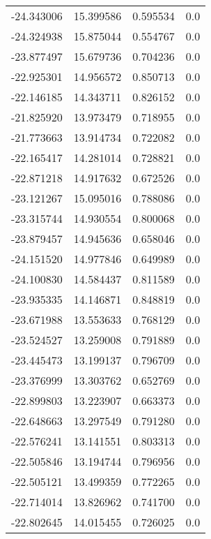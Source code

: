 \begin{tabular}{rrrr}
      -24.343006 &        15.399586 &    0.595534 &   0.0 \\
      -24.324938 &        15.875044 &    0.554767 &   0.0 \\
      -23.877497 &        15.679736 &    0.704236 &   0.0 \\
      -22.925301 &        14.956572 &    0.850713 &   0.0 \\
      -22.146185 &        14.343711 &    0.826152 &   0.0 \\
      -21.825920 &        13.973479 &    0.718955 &   0.0 \\
      -21.773663 &        13.914734 &    0.722082 &   0.0 \\
      -22.165417 &        14.281014 &    0.728821 &   0.0 \\
      -22.871218 &        14.917632 &    0.672526 &   0.0 \\
      -23.121267 &        15.095016 &    0.788086 &   0.0 \\
      -23.315744 &        14.930554 &    0.800068 &   0.0 \\
      -23.879457 &        14.945636 &    0.658046 &   0.0 \\
      -24.151520 &        14.977846 &    0.649989 &   0.0 \\
      -24.100830 &        14.584437 &    0.811589 &   0.0 \\
      -23.935335 &        14.146871 &    0.848819 &   0.0 \\
      -23.671988 &        13.553633 &    0.768129 &   0.0 \\
      -23.524527 &        13.259008 &    0.791889 &   0.0 \\
      -23.445473 &        13.199137 &    0.796709 &   0.0 \\
      -23.376999 &        13.303762 &    0.652769 &   0.0 \\
      -22.899803 &        13.223907 &    0.663373 &   0.0 \\
      -22.648663 &        13.297549 &    0.791280 &   0.0 \\
      -22.576241 &        13.141551 &    0.803313 &   0.0 \\
      -22.505846 &        13.194744 &    0.796956 &   0.0 \\
      -22.505121 &        13.499359 &    0.772265 &   0.0 \\
      -22.714014 &        13.826962 &    0.741700 &   0.0 \\
      -22.802645 &        14.015455 &    0.726025 &   0.0 \\

\end{tabular}
